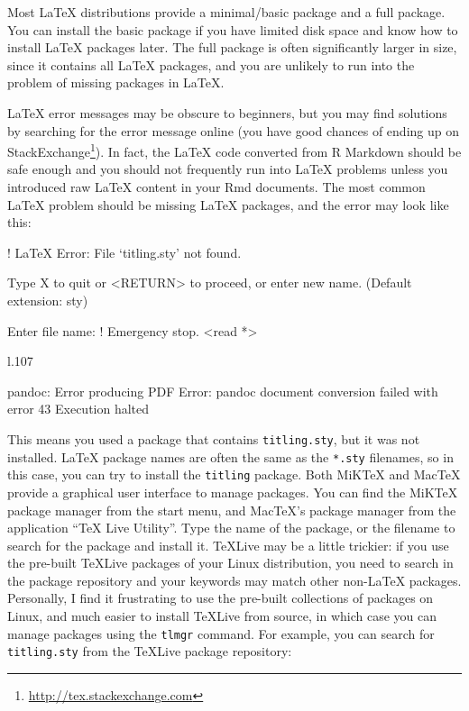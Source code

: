 \documentclass[12pt,]{krantz}
\makeatletter
\newenvironment{Shaded}{\begin{snugshade}}{\end{snugshade}}
\newcommand{\NormalTok}[1]{#1}
\renewcommand{\href}[2]{#2\footnote{\url{#1}}}
\newenvironment{kframe}{%
\medskip{}
\setlength{\fboxsep}{.8em}
 \def\at@end@of@kframe{}%
 \ifinner\ifhmode%
  \def\at@end@of@kframe{\end{minipage}}%
  \begin{minipage}{\columnwidth}%
 \fi\fi%
 \def\FrameCommand##1{\hskip\@totalleftmargin \hskip-\fboxsep
 \colorbox{shadecolor}{##1}\hskip-\fboxsep
     \hskip-\linewidth \hskip-\@totalleftmargin \hskip\columnwidth}%
 \MakeFramed {\advance\hsize-\width
   \@totalleftmargin\z@ \linewidth\hsize
   \@setminipage}}%
 {\par\unskip\endMakeFramed%
 \at@end@of@kframe}
\renewenvironment{Shaded}{\begin{kframe}}{\end{kframe}}
\theoremstyle{definition}
\theoremstyle{definition}
\theoremstyle{definition}
\theoremstyle{remark}
\makeatother
\begin{document}
Most LaTeX distributions provide a minimal/basic package and a full
package. You can install the basic package if you have limited disk
space and know how to install LaTeX packages later. The full package is
often significantly larger in size, since it contains all LaTeX
packages, and you are unlikely to run into the problem of missing
packages in LaTeX.

LaTeX error messages may be obscure to beginners, but you may find
solutions by searching for the error message online (you have good
chances of ending up on
\href{http://tex.stackexchange.com}{StackExchange}). In fact, the LaTeX
code converted from R Markdown should be safe enough and you should not
frequently run into LaTeX problems unless you introduced raw LaTeX
content in your Rmd documents. The most common LaTeX problem should be
missing LaTeX packages, and the error may look like this:

\begin{Shaded}
\begin{Highlighting}[]
\NormalTok{! LaTeX Error: File `titling.sty' not found.}

\NormalTok{Type X to quit or <RETURN> to proceed,}
\NormalTok{or enter new name. (Default extension: sty)}

\NormalTok{Enter file name: }
\NormalTok{! Emergency stop.}
\NormalTok{<read *> }
         
\NormalTok{l.107 ^^M}

\NormalTok{pandoc: Error producing PDF}
\NormalTok{Error: pandoc document conversion failed with error 43}
\NormalTok{Execution halted}
\end{Highlighting}
\end{Shaded}

This means you used a package that contains \texttt{titling.sty}, but it
was not installed. LaTeX package names are often the same as the
\texttt{*.sty} filenames, so in this case, you can try to install the
\texttt{titling} package. Both MiKTeX and MacTeX provide a graphical
user interface to manage packages. You can find the MiKTeX package
manager from the start menu, and MacTeX's package manager from the
application ``TeX Live Utility''. Type the name of the package, or the
filename to search for the package and install it. TeXLive may be a
little trickier: if you use the pre-built TeXLive packages of your Linux
distribution, you need to search in the package repository and your
keywords may match other non-LaTeX packages. Personally, I find it
frustrating to use the pre-built collections of packages on Linux, and
much easier to install TeXLive from source, in which case you can manage
packages using the \texttt{tlmgr} command. For example, you can search
for \texttt{titling.sty} from the TeXLive package repository:
\end{document}
